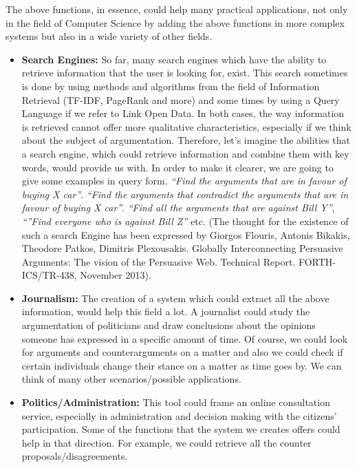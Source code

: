 The above functions, in essence, could help many practical applications, not only in the field of Computer Science by adding the above functions in more complex systems but also in a wide variety of other fields.\\

\begin{itemize}

	\item \textbf{Search Engines:} So far, many search engines which have the ability to retrieve information that the user is looking for, exist. This search sometimes is done by using methods and algorithms from the field of Information Retrieval (TF-IDF, PageRank and more) and some times by using a Query Language if we refer to Link Open Data. In both cases, the way information is retrieved cannot offer more qualitative characteristics, especially if we think about the subject of argumentation. Therefore, let's imagine the abilities that a search engine, which could retrieve information and combine them with key words, would  provide us with. In order to make it clearer, we are going to give some examples in query form. \textit{``Find the arguments that are in favour of buying X car''}. \textit{``Find the arguments that contradict the arguments that are in favour of buying X car''}. \textit{``Find all the arguments that are against Bill Y''}, \textit{``''Find everyone who is against Bill Z''} etc. (The thought for the existence of such a search Engine has been expressed by Giorgos Flouris, Antonis Bikakis, Theodore Patkos, Dimitris Plexousakis. Globally Interconnecting Persuasive Arguments: The vision of the Persuasive Web. Technical Report. FORTH-ICS/TR-438, November 2013).
	\item \textbf{Journalism:} The creation of a system which could extract all the above information, would help this field a lot. A journalist could study the argumentation of politicians and draw conclusions about the opinions someone has expressed  in a specific amount of time. Of course, we could look for arguments and counterarguments on a matter and also we could check if certain individuals change their stance on a matter as time goes by. We can think of many other scenarios/possible applications.
	\item \textbf{Politics/Administration:} This tool could frame an online consultation service, especially in administration and decision making with the citizens' participation. Some of the functions that the system we creates offers could help in that direction. For example, we could retrieve all the counter proposals/disagreements.\\

\end{itemize}


